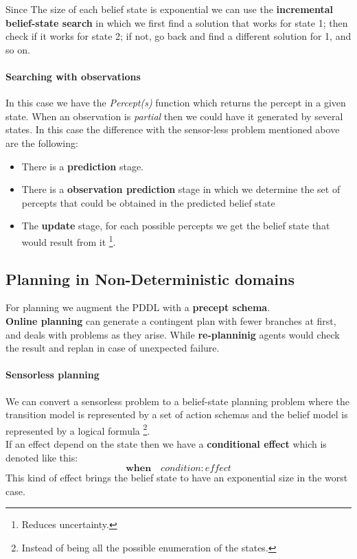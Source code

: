 \documentclass[5pt,a4paper]{article}
\begin{document}
\begin{itemize}
Since The size of each belief state is exponential we can use the \textbf{incremental belief-state search} in which we first find a solution that works for state 1; then check if it works for state 2; if not, go back and find a different solution for 1, and so on.

\paragraph{Searching with observations}
In this case we have the \textit{Percept(s)} function which returns the percept in a given state. When an observation is \textit{partial} then we could have it generated by several states.  In this case the difference with the sensor-less problem mentioned above are the following:
\begin{itemize}
\item There is a \textbf{prediction} stage.
\item There is a \textbf{observation prediction} stage in which we determine the set of percepts that could be obtained in the predicted belief state
\item The \textbf{update} stage, for each possible percepts we get the belief state that would result from it \footnote{Reduces uncertainty.}.
\end{itemize}


\subsection{Planning in Non-Deterministic domains}


For planning we augment the PDDL with a \textbf{precept schema}.\\
\textbf{Online planning} can generate a contingent plan with fewer branches at first, and deals with problems as they arise. While \textbf{re-planninig} agents would check the result and replan in case of unexpected failure.



\paragraph{Sensorless planning}
We can convert a sensorless problem to a belief-state planning problem where the transition model is represented by a set of action schemas and the belief model is represented by a logical formula \footnote{Instead of being all the possible enumeration of the states.}.\\
If an effect depend on the state then we have a \textbf{conditional effect} which is denoted like this:
\[\textbf{when}\quad condition: effect\]
This kind of effect brings the belief state to have an exponential size in the worst case.


\end{itemize}
\end{document}
